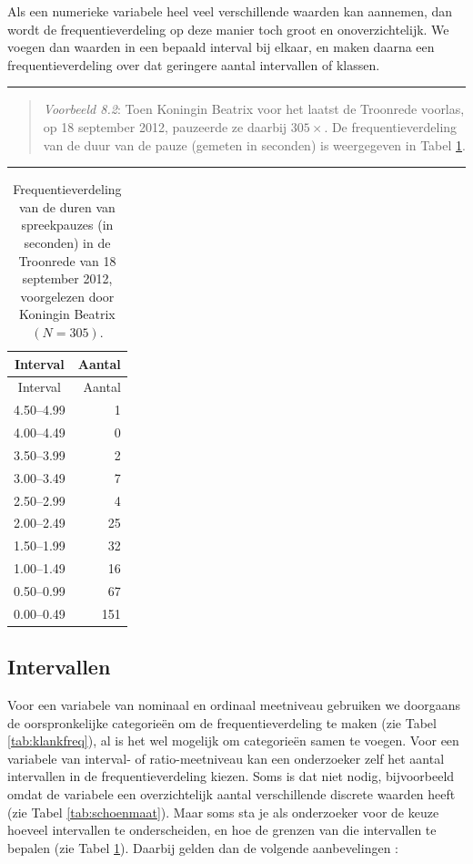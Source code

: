 \documentclass[
]{book}
\begin{document}
Als een numerieke variabele heel veel verschillende waarden kan
aannemen, dan wordt de frequentieverdeling op deze manier toch groot en
onoverzichtelijk. We voegen dan waarden in een bepaald interval bij
elkaar, en maken daarna een frequentieverdeling over dat geringere
aantal intervallen of klassen.

\begin{center}\rule{0.5\linewidth}{0.5pt}\end{center}

\begin{quote}
\emph{Voorbeeld 8.2}: Toen Koningin Beatrix voor het laatst de Troonrede voorlas,
op 18 september 2012, pauzeerde ze daarbij \(305\times\). De frequentieverdeling
van de duur van de pauze (gemeten in seconden) is weergegeven in
Tabel \ref{tab:troonrede2012pauzes}.
\end{quote}

\begin{center}\rule{0.5\linewidth}{0.5pt}\end{center}

\begin{longtable}[]{@{}cr@{}}
\caption{\label{tab:troonrede2012pauzes} Frequentieverdeling van de duren van spreekpauzes (in seconden) in de Troonrede van 18 september 2012, voorgelezen door Koningin Beatrix \((N=305)\).}\tabularnewline
\toprule
Interval & Aantal\tabularnewline
\midrule
\endfirsthead
\toprule
Interval & Aantal\tabularnewline
\midrule
\endhead
4.50--4.99 & 1\tabularnewline
4.00--4.49 & 0\tabularnewline
3.50--3.99 & 2\tabularnewline
3.00--3.49 & 7\tabularnewline
2.50--2.99 & 4\tabularnewline
2.00--2.49 & 25\tabularnewline
1.50--1.99 & 32\tabularnewline
1.00--1.49 & 16\tabularnewline
0.50--0.99 & 67\tabularnewline
0.00--0.49 & 151\tabularnewline
\bottomrule
\end{longtable}

\hypertarget{sec:intervallen}{%
\subsection{Intervallen}\label{sec:intervallen}}

Voor een variabele van nominaal en ordinaal meetniveau gebruiken we
doorgaans de oorspronkelijke categorieën om de frequentieverdeling te
maken (zie Tabel \ref{tab:klankfreq}), al is het wel mogelijk om categorieën samen
te voegen. Voor een variabele van interval- of ratio-meetniveau kan een
onderzoeker zelf het aantal intervallen in de frequentieverdeling
kiezen. Soms is dat niet nodig, bijvoorbeeld omdat de variabele een
overzichtelijk aantal verschillende discrete waarden heeft (zie
Tabel \ref{tab:schoenmaat}). Maar soms sta je als onderzoeker
voor de keuze hoeveel intervallen te onderscheiden, en hoe de grenzen
van die intervallen te bepalen (zie Tabel \ref{tab:troonrede2012pauzes}).
Daarbij gelden dan de volgende aanbevelingen \citep[Ch.2]{Ferg89}:
\end{document}
